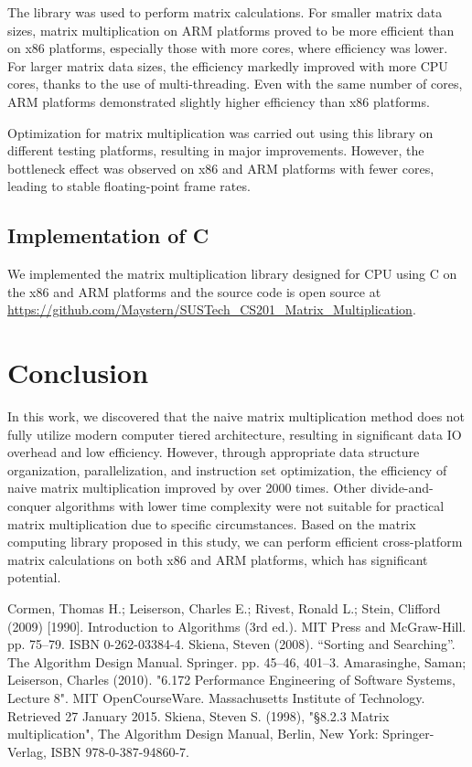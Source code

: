 \documentclass[conference]{IEEEtran}
\begin{document}
	The library was used to perform matrix calculations. For smaller matrix data sizes, matrix multiplication on ARM platforms proved to be more efficient than on x86 platforms, especially those with more cores, where efficiency was lower. For larger matrix data sizes, the efficiency markedly improved with more CPU cores, thanks to the use of multi-threading. Even with the same number of cores, ARM platforms demonstrated slightly higher efficiency than x86 platforms.
	
	Optimization for matrix multiplication was carried out using this library on different testing platforms, resulting in major improvements. However, the bottleneck effect was observed on x86 and ARM platforms with fewer cores, leading to stable floating-point frame rates.
	
	\subsection{Implementation of C}
		We implemented the matrix multiplication library designed for CPU using C on the x86 and ARM platforms and the source code is open source at \url{https://github.com/Maystern/SUSTech_CS201_Matrix_Multiplication}.
	
	\section{Conclusion}
	
	In this work, we discovered that the naive matrix multiplication method does not fully utilize modern computer tiered architecture, resulting in significant data IO overhead and low efficiency. However, through appropriate data structure organization, parallelization, and instruction set optimization, the efficiency of naive matrix multiplication improved by over 2000 times. Other divide-and-conquer algorithms with lower time complexity were not suitable for practical matrix multiplication due to specific circumstances. Based on the matrix computing library proposed in this study, we can perform efficient cross-platform matrix calculations on both x86 and ARM platforms, which has significant potential.
	
	
	\begin{thebibliography}{00}
		 Cormen, Thomas H.; Leiserson, Charles E.; Rivest, Ronald L.; Stein, Clifford (2009) [1990]. Introduction to Algorithms (3rd ed.). MIT Press and McGraw-Hill. pp. 75–79. ISBN 0-262-03384-4.
		  Skiena, Steven (2008). ``Sorting and Searching''. The Algorithm Design Manual. Springer. pp. 45–46, 401–3.
		 Amarasinghe, Saman; Leiserson, Charles (2010). "6.172 Performance Engineering of Software Systems, Lecture 8". MIT OpenCourseWare. Massachusetts Institute of Technology. Retrieved 27 January 2015.
		 Skiena, Steven S. (1998), "§8.2.3 Matrix multiplication", The Algorithm Design Manual, Berlin, New York: Springer-Verlag, ISBN 978-0-387-94860-7.
	\end{thebibliography}
	
\end{document}

